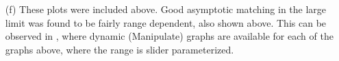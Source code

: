 {\begin{enumerate}

\item[(f)]
These plots were included above.  Good asymptotic matching in the large limit was found to be fairly range dependent, also shown above.  This can be observed in , where dynamic (Manipulate) graphs are available for each of the graphs above, where the range is slider parameterized.
\end{enumerate}
} %


